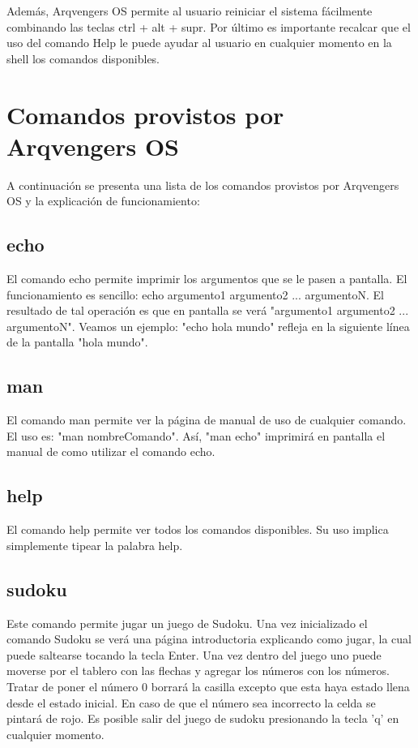 \documentclass[a4paper,10pt]{article}
\begin{document}
\vspace{1cm}

Además, Arqvengers OS permite al usuario reiniciar el sistema fácilmente combinando las teclas ctrl + alt + supr.
Por último es importante recalcar que el uso del comando Help le puede ayudar al usuario en cualquier momento en la shell los comandos disponibles.

\section{Comandos provistos por Arqvengers OS}
    A continuación se presenta una lista de los comandos provistos por Arqvengers OS y la explicación de funcionamiento:

    \subsection{echo}
       El comando echo permite imprimir los argumentos que se le pasen a pantalla.
       El funcionamiento es sencillo: echo argumento1 argumento2 ... argumentoN.
       El resultado de tal operación es que en pantalla se verá "argumento1 argumento2 ... argumentoN".
       Veamos un ejemplo:
       "echo hola mundo" refleja en la siguiente línea de la pantalla "hola mundo". 
    \subsection{man}
        El comando man permite ver la página de manual de uso de cualquier comando.
        El uso es: "man nombreComando".
        Así, "man echo" imprimirá en pantalla el manual de como utilizar el comando echo.
    \subsection{help}
        El comando help permite ver todos los comandos disponibles. Su uso implica simplemente tipear la palabra help.
    \subsection{sudoku}
        Este comando permite jugar un juego de Sudoku.
        Una vez inicializado el comando Sudoku se verá una página introductoria explicando como jugar, la cual puede saltearse tocando la tecla Enter.
        Una vez dentro del juego uno puede moverse por el tablero con las flechas y agregar los números con los números. Tratar de poner el número 0 borrará la casilla excepto que esta haya estado llena desde el estado inicial. En caso de que el número sea incorrecto la celda se pintará de rojo.
        Es posible salir del juego de sudoku presionando la tecla 'q' en cualquier momento.
\end{document}
